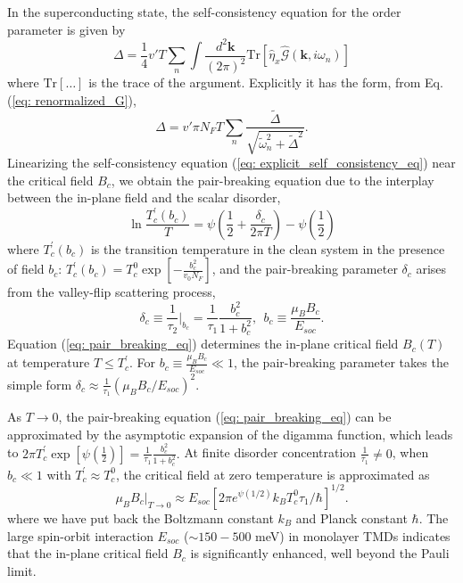 In the superconducting state, the self-consistency equation for the
order parameter is given by
\begin{equation}
\Delta=\frac{1}{4}v'T\sum_{n}\int\frac{d^{2}\mathbf{k}}{(2\pi)^{2}}\mathrm{Tr}\left[\hat{\eta}_{x}\hat{\mathcal{G}}(\mathbf{k},i\omega_{n})\right]\label{eq: self_consistency_eq}
\end{equation}
where $\mathrm{Tr}\left[\dots\right]$ is the trace of the argument.
Explicitly it has the form, from Eq. (\ref{eq: renormalized_G}),
\begin{equation}
\Delta=v'\pi N_{F}T\sum_{n}\frac{\tilde{\Delta}}{\sqrt{\tilde{\omega}_{n}^{2}+\tilde{\Delta}^{2}}}.\label{eq: explicit_self_consistency_eq}
\end{equation}
Linearizing the self-consistency equation (\ref{eq: explicit_self_consistency_eq})
near the critical field $B_{c}$, we obtain the pair-breaking equation
due to the interplay between the in-plane field and the scalar disorder,
\begin{equation}
\ln\frac{T_{c}^{'}(b_{c})}{T}=\psi\left(\frac{1}{2}+\frac{\delta_{c}}{2\pi T}\right)-\psi\left(\frac{1}{2}\right)\label{eq: pair_breaking_eq}
\end{equation}
where $T_{c}^{'}(b_{c})$ is the transition temperature in the clean
system in the presence of field $b_{c}$: $T_{c}^{'}(b_{c})=T_{c}^{0}\exp\left[-\frac{b_{c}^{2}}{v_{0}N_{F}}\right]$,
and the pair-breaking parameter $\delta_{c}$ arises from the valley-flip
scattering process,
\begin{equation}
\delta_{c}\equiv\frac{1}{\tau_{2}}\biggl|_{b_{c}}=\frac{1}{\tau_{1}}\frac{b_{c}^{2}}{1+b_{c}^{2}},\ \ b_{c}\equiv\frac{\mu_{B}B_{c}}{E_{soc}}.\label{eq: parameter_pair_breaking}
\end{equation}
Equation (\ref{eq: pair_breaking_eq}) determines the in-plane critical
field $B_{c}(T)$ at temperature $T\leq T_{c}^{'}$. For $b_{c}\equiv\frac{\mu_{B}B_{c}}{E_{soc}}\ll1$,
the pair-breaking parameter takes the simple form $\delta_{c}\approx\frac{1}{\tau_{1}}\left(\mu_{B}B_{c}/E_{soc}\right)^{2}$.

As $T\rightarrow0$, the pair-breaking equation (\ref{eq: pair_breaking_eq})
can be approximated by the asymptotic expansion of the digamma function,
which leads to $2\pi T_{c}^{'}\exp\left[\psi(\frac{1}{2})\right]=\frac{1}{\tau_{1}}\frac{b_{c}^{2}}{1+b_{c}^{2}}.$
At finite disorder concentration $\frac{1}{\tau_{1}}\neq0$, when
$b_{c}\ll1$ with $T_{c}^{'}\approx T_{c}^{0}$, the critical field at zero temperature is approximated as
\begin{equation}
\mu_{B}B_{c}\biggl|_{T\rightarrow0}\approx E_{soc}\left[2\pi e^{\psi(1/2)}k_{B}T_{c}^{0}\tau_{1}/\hbar\right]^{1/2}.\label{eq: zero_T_Bc}
\end{equation}
where we have put back the Boltzmann constant $k_{B}$ and
Planck constant $\hbar$. The large spin-orbit interaction $E_{soc}$
($\sim150-500$ meV) in monolayer TMDs indicates that the in-plane
critical field $B_{c}$ is significantly enhanced, well beyond the
Pauli limit.
